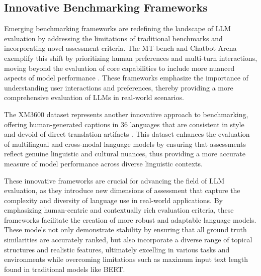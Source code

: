 \subsection{Innovative Benchmarking Frameworks} \label{subsec:Innovative Benchmarking Frameworks}



Emerging benchmarking frameworks are redefining the landscape of LLM evaluation by addressing the limitations of traditional benchmarks and incorporating novel assessment criteria. The MT-bench and Chatbot Arena exemplify this shift by prioritizing human preferences and multi-turn interactions, moving beyond the evaluation of core capabilities to include more nuanced aspects of model performance \cite{JudgingLLM2}. These frameworks emphasize the importance of understanding user interactions and preferences, thereby providing a more comprehensive evaluation of LLMs in real-world scenarios.



The XM3600 dataset represents another innovative approach to benchmarking, offering human-generated captions in 36 languages that are consistent in style and devoid of direct translation artifacts \cite{thapliyal2022crossmodal3600massivelymultilingualmultimodal}. This dataset enhances the evaluation of multilingual and cross-modal language models by ensuring that assessments reflect genuine linguistic and cultural nuances, thus providing a more accurate measure of model performance across diverse linguistic contexts.



These innovative frameworks are crucial for advancing the field of LLM evaluation, as they introduce new dimensions of assessment that capture the complexity and diversity of language use in real-world applications. By emphasizing human-centric and contextually rich evaluation criteria, these frameworks facilitate the creation of more robust and adaptable language models. These models not only demonstrate stability by ensuring that all ground truth similarities are accurately ranked, but also incorporate a diverse range of topical structures and realistic features, ultimately excelling in various tasks and environments while overcoming limitations such as maximum input text length found in traditional models like BERT. \cite{ginzburg2021selfsuperviseddocumentsimilarityranking,shi2019newevaluationframeworktopic}











